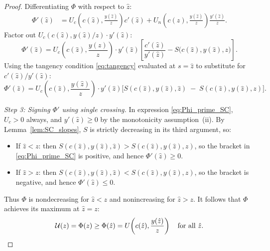 \documentclass[12pt,a4paper]{article}
\theoremstyle{definition}
\theoremstyle{plain}
\theoremstyle{remark}
\newcommand{\calU}{\mathcal{U}}
\begin{document}
\begin{proof}
Differentiating $\Phi$ with respect to $\hat z$:
\begin{align}
  \Phi'(\hat z)
  &= U_c\!\left(c(\hat z), \frac{y(\hat z)}{z}\right) c'(\hat z)
     + U_n\!\left(c(\hat z), \frac{y(\hat z)}{z}\right) \frac{y'(\hat z)}{z}.
  \label{eq:Phi_prime_raw}
\end{align}
Factor out $U_c(c(\hat z), y(\hat z)/z) \cdot y'(\hat z)$:
\begin{equation}
\label{eq:Phi_prime}
  \Phi'(\hat z)
  = U_c\!\left(c(\hat z), \frac{y(\hat z)}{z}\right) \cdot y'(\hat z)
     \left[ \frac{c'(\hat z)}{y'(\hat z)} - S\bigl(c(\hat z), y(\hat z), z\bigr) \right].
\end{equation}
Using the tangency condition \eqref{eq:tangency} evaluated at $s = \hat z$ to substitute for $c'(\hat z)/y'(\hat z)$:
\begin{equation}
\label{eq:Phi_prime_SC}
  \Phi'(\hat z)
  = U_c\!\left(c(\hat z), \frac{y(\hat z)}{z}\right) \cdot y'(\hat z)
    \bigl[ S(c(\hat z), y(\hat z), \hat z) \;-\; S(c(\hat z), y(\hat z), z) \bigr].
\end{equation}

\emph{Step 3: Signing $\Phi'$ using single crossing.}
In expression \eqref{eq:Phi_prime_SC}, $U_c > 0$ always, and $y'(\hat z) \geq 0$ by the monotonicity assumption~(ii). By Lemma~\ref{lem:SC_slopes}, $S$ is strictly decreasing in its third argument, so:
\begin{itemize}
  \item If $\hat z < z$: then $S(c(\hat z), y(\hat z), \hat z) > S(c(\hat z), y(\hat z), z)$, so the bracket in \eqref{eq:Phi_prime_SC} is positive, and hence $\Phi'(\hat z) \geq 0$.
  \item If $\hat z > z$: then $S(c(\hat z), y(\hat z), \hat z) < S(c(\hat z), y(\hat z), z)$, so the bracket is negative, and hence $\Phi'(\hat z) \leq 0$.
\end{itemize}
Thus $\Phi$ is nondecreasing for $\hat z < z$ and nonincreasing for $\hat z > z$. It follows that $\Phi$ achieves its maximum at $\hat z = z$:
\[
  \calU(z) = \Phi(z) \geq \Phi(\hat z) = U\!\left(c(\hat z), \frac{y(\hat z)}{z}\right) \quad \text{for all } \hat z. \qedhere
\]
\end{proof}
\end{document}
